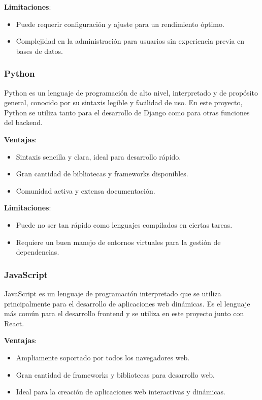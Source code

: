 \textbf{Limitaciones}:
\begin{itemize}
  \item Puede requerir configuración y ajuste para un rendimiento óptimo.
  \item Complejidad en la administración para usuarios sin experiencia previa en bases de datos.
\end{itemize}

\subsubsection{Python}

Python es un lenguaje de programación de alto nivel, interpretado y de propósito general, conocido por su sintaxis legible y facilidad de uso. En este proyecto, Python se utiliza tanto para el desarrollo de Django como para otras funciones del backend.

\textbf{Ventajas}:
\begin{itemize}
  \item Sintaxis sencilla y clara, ideal para desarrollo rápido.
  \item Gran cantidad de bibliotecas y frameworks disponibles.
  \item Comunidad activa y extensa documentación.
\end{itemize}

\textbf{Limitaciones}:
\begin{itemize}
  \item Puede no ser tan rápido como lenguajes compilados en ciertas tareas.
  \item Requiere un buen manejo de entornos virtuales para la gestión de dependencias.
\end{itemize}

\subsubsection{JavaScript}

JavaScript es un lenguaje de programación interpretado que se utiliza principalmente para el desarrollo de aplicaciones web dinámicas. Es el lenguaje más común para el desarrollo frontend y se utiliza en este proyecto junto con React.

\textbf{Ventajas}:
\begin{itemize}
  \item Ampliamente soportado por todos los navegadores web.
  \item Gran cantidad de frameworks y bibliotecas para desarrollo web.
  \item Ideal para la creación de aplicaciones web interactivas y dinámicas.
\end{itemize}

